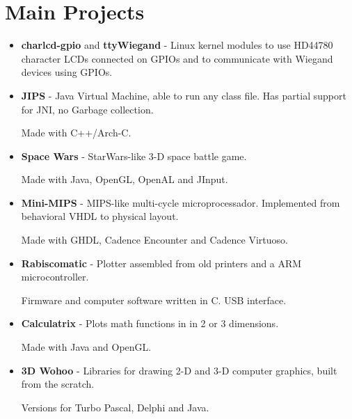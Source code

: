 \documentclass[a4paper,10pt]{article}
\begin{document}
  \section{Main Projects}
    \begin{itemize}
      \item 
        \textbf{charlcd-gpio} and \textbf{ttyWiegand} - Linux kernel modules to use HD44780 character LCDs connected on GPIOs and to communicate with Wiegand devices using GPIOs.

      \item 
        \textbf{JIPS} - Java Virtual Machine, able to run any class file. Has partial support for JNI, no Garbage collection.

        Made with C++/Arch-C.

      \item 
        \textbf{Space Wars} - StarWars-like 3-D space battle game.

        Made with Java, OpenGL, OpenAL and JInput.

      \item 
        \textbf{Mini-MIPS} - MIPS-like multi-cycle microprocessador. Implemented from behavioral VHDL to physical layout.

        Made with GHDL, Cadence Encounter and Cadence Virtuoso.

      \item 
        \textbf{Rabiscomatic} - Plotter assembled from old printers and a ARM microcontroller.

        Firmware and computer software written in C. USB interface.

      \item 
        \textbf{Calculatrix} - Plots math functions in in 2 or 3 dimensions.

        Made with Java and OpenGL.

      \item 
        \textbf{3D Wohoo} - Libraries for drawing 2-D and 3-D computer graphics, built from the scratch.

        Versions for Turbo Pascal, Delphi and Java.
    \end{itemize}
\end{document}
